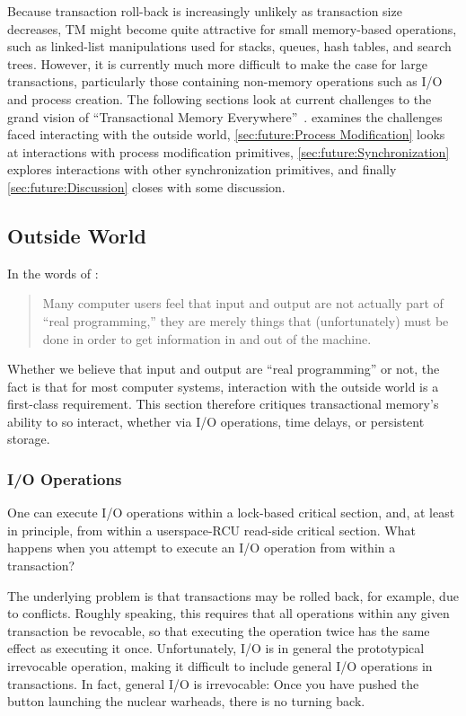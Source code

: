 Because transaction roll-back is increasingly unlikely as transaction
size decreases, TM might become quite attractive for small memory-based
operations,
such as linked-list manipulations used for stacks, queues, hash tables,
and search trees.
However, it is currently much more difficult to make the case for large
transactions, particularly those containing non-memory operations such
as I/O and process creation.
The following sections look at current challenges to the grand vision of
``Transactional Memory Everywhere''~\cite{PaulEMcKenney2009TMeverywhere}.
 examines the challenges faced
interacting with the outside world,
\cref{sec:future:Process Modification} looks at interactions
with process modification primitives,
\cref{sec:future:Synchronization} explores interactions with
other synchronization primitives, and finally
\cref{sec:future:Discussion} closes with some discussion.

\subsection{Outside World}
\label{sec:future:Outside World}

In the words of :

\begin{quote}
	Many computer users feel that input and output are not actually part
	of ``real programming,'' they are merely things that (unfortunately)
	must be done in order to get information in and out of the machine.
\end{quote}

Whether we believe that input and output are ``real programming'' or
not, the fact is that for most computer systems, interaction with the
outside world is a first-class requirement.
This section therefore critiques transactional memory's ability to
so interact, whether via I/O operations, time delays, or persistent
storage.

\subsubsection{I/O Operations}
\label{sec:future:I/O Operations}

One can execute I/O operations within a lock-based critical section,
and, at least in principle, from within a userspace-RCU read-side
critical section.
What happens when you attempt to execute an I/O operation from within
a transaction?

The underlying problem is that transactions may be rolled back, for
example, due to conflicts.
Roughly speaking, this requires that all operations within any given
transaction be revocable, so that executing the operation twice has
the same effect as executing it once.
Unfortunately, I/O is in general the prototypical irrevocable
operation, making it difficult to include general I/O operations in
transactions.
In fact, general I/O is irrevocable:
Once you have pushed the button launching the nuclear warheads, there
is no turning back.

